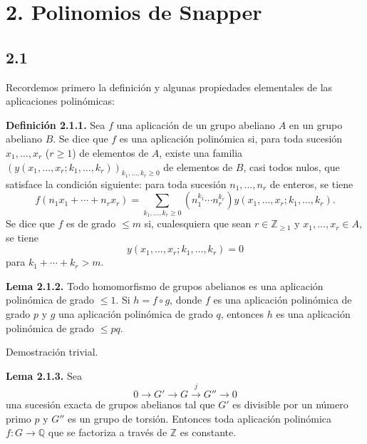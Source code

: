 
\providecommand{\sisi}[2]{#2}

\section*{2. Polinomios de Snapper}

\subsection*{2.1}
Recordemos primero la definición y algunas propiedades elementales de las
aplicaciones polinómicas:

\textbf{Definición 2.1.1.} Sea $f$ una aplicación de un grupo abeliano $A$
en un grupo abeliano $B$. Se dice que $f$ es una aplicación polinómica si,
para toda sucesión $x_1,\ldots,x_r$ ($r\geq1$) de elementos de $A$, existe
una familia
$(y(x_1,\ldots,x_r;k_1,\ldots,k_r))_{k_1,\ldots,k_r\geq0}$ de elementos de
$B$, casi todos nulos, que satisface la condición siguiente: para toda
sucesión $n_1,\ldots,n_r$ de enteros, se tiene
\[
f(n_1x_1+\cdots+n_rx_r)=
\sum_{k_1,\ldots,k_r\geq0}(n_1^{k_1}\cdots n_r^{k_r})
y(x_1,\ldots,x_r;k_1,\ldots,k_r).
\]
Se dice que $f$ es de grado $\leq m$ si, cualesquiera que sean
$r\in\sisi{\mathbb Z}{\mathbb Z_{\geq1}}$ y
$x_1,\ldots,x_r\in A$, se tiene
\[
y(x_1,\ldots,x_r;k_1,\ldots,k_r)=0
\]
para $k_1+\cdots+k_r>m$.

\textbf{Lema 2.1.2.} Todo homomorfismo de grupos abelianos es una aplicación
polinómica de grado $\leq1$. Si $h=f\circ g$, donde $f$ es una aplicación
polinómica de grado $p$ y $g$ una aplicación polinómica de grado $q$, entonces
$h$ es una aplicación polinómica de grado $\leq pq$.

Demostración trivial.

\textbf{Lema 2.1.3.} Sea
\[
0\longrightarrow G'\longrightarrow G\xrightarrow{j}G''\longrightarrow0
\]
una sucesión exacta de grupos abelianos tal que $G'$ es divisible por un
número primo $p$ y $G''$ es un grupo de torsión. Entonces toda aplicación
polinómica $f:G\to\mathbb Q$ que se factoriza a través de $\mathbb Z$ es
constante.

